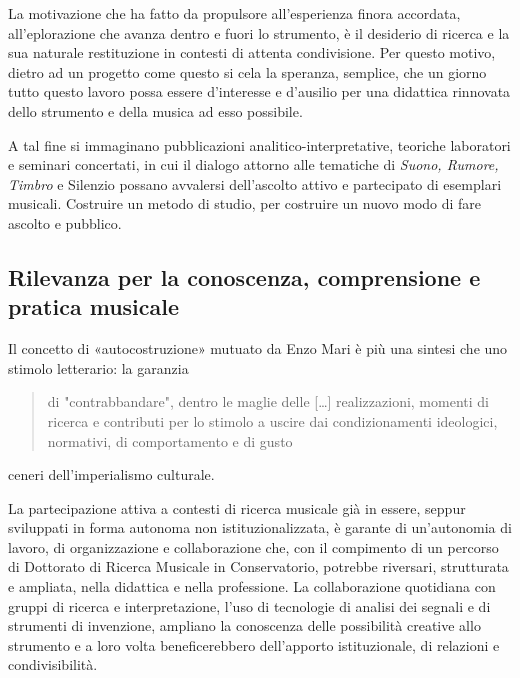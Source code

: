 \documentclass{gs-adonis}
\begin{document}

La motivazione che ha fatto da propulsore all'esperienza finora accordata,
all'eplorazione che avanza dentro e fuori lo strumento, è il desiderio di
ricerca e la sua naturale restituzione in contesti di attenta condivisione. Per
questo motivo, dietro ad un progetto come questo si cela la speranza, semplice,
che un giorno tutto questo lavoro possa essere d'interesse e d'ausilio per una
didattica rinnovata dello strumento e della musica ad esso possibile.

A tal fine si immaginano pubblicazioni analitico-interpretative, teoriche
laboratori e seminari concertati, in cui il dialogo attorno alle
tematiche di \emph{Suono, Rumore, Timbro} e Silenzio possano avvalersi dell'ascolto
attivo e partecipato di esemplari musicali. Costruire un metodo di studio, per
costruire un nuovo modo di fare ascolto e pubblico.

\subsection{Rilevanza per la conoscenza, comprensione e pratica musicale}



Il concetto di «autocostruzione» mutuato da Enzo Mari \cite{mari2002} è più una
sintesi che uno stimolo letterario: la garanzia

\begin{quote}
  di "contrabbandare", dentro le maglie delle […] realizzazioni, momenti di
  ricerca e contributi per lo stimolo a uscire dai condizionamenti ideologici,
  normativi, di comportamento e di gusto
\end{quote}

ceneri dell'imperialismo culturale.

La partecipazione attiva a contesti di ricerca musicale già in essere, seppur
sviluppati in forma autonoma non istituzionalizzata, è garante di un'autonomia
di lavoro, di organizzazione e collaborazione che, con il compimento di un
percorso di Dottorato di Ricerca Musicale in Conservatorio, potrebbe riversari,
strutturata e ampliata, nella didattica e nella professione. La collaborazione
quotidiana con gruppi di ricerca e interpretazione, l'uso di tecnologie di
analisi dei segnali e di strumenti di invenzione, ampliano la conoscenza
delle possibilità creative allo strumento e a loro volta beneficerebbero
dell'apporto istituzionale, di relazioni e condivisibilità.
\end{document}

